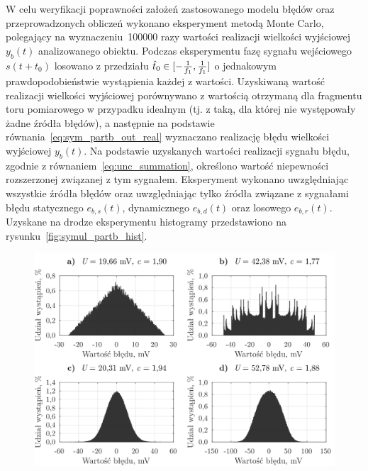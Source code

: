 W celu weryfikacji poprawności założeń zastosowanego modelu błędów oraz przeprowadzonych obliczeń wykonano eksperyment metodą Monte Carlo, polegający na wyznaczeniu~\num{100000} razy wartości realizacji wielkości wyjściowej $y_{b}(t)$ analizowanego obiektu. Podczas eksperymentu fazę sygnału wejściowego $s(t+t_{0})$ losowano z przedziału $\hat{t}_{0} \in \interval{-\frac{1}{f_{1}}}{\frac{1}{f_{1}}}$ o jednakowym prawdopodobieństwie wystąpienia każdej z wartości. Uzyskiwaną wartość realizacji wielkości wyjściowej porównywano z wartością otrzymaną dla fragmentu toru pomiarowego w przypadku idealnym (tj. z taką, dla której nie występowały żadne źródła błędów), a następnie na podstawie równania~\eqref{eq:sym_partb_out_real} wyznaczano realizację błędu wielkości wyjściowej $y_{b}(t)$. Na podstawie uzyskanych wartości realizacji sygnału błędu, zgodnie z równaniem~\eqref{eq:unc_summation}, określono wartość niepewności rozszerzonej związanej z tym sygnałem. Eksperyment wykonano uwzględniając wszystkie źródła błędów oraz uwzględniając tylko źródła związane z sygnałami błędu statycznego $e_{b,s}(t)$, dynamicznego $e_{b,d}(t)$ oraz losowego $e_{b,r}(t)$. Uzyskane na drodze eksperymentu histogramy przedstawiono na rysunku~\ref{fig:symul_partb_hist}.

\begin{figure}[htb!]
\includegraphics{obrazki/hist_part_b}
\end{figure}


